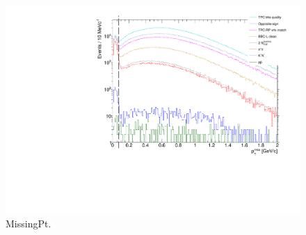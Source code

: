 

\begin{figure}[ht!]
\centering%
\includegraphics[width=0.633\linewidth,page=1]{graphics/eventSelection/MissingPt.pdf}%
\caption{MissingPt.}\label{fig:MissingPt}%
\end{figure}

 





